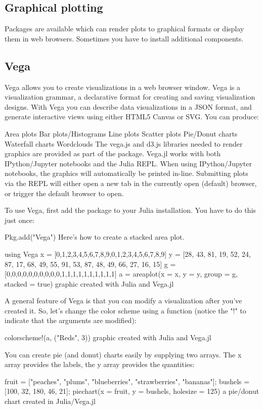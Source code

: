 \subsection*{Graphical plotting}
Packages are available which can render plots to graphical formats or display them in web browsers. Sometimes you have to install additional components.

\subsection*{Vega}
Vega allows you to create visualizations in a web browser window. Vega is a visualization grammar, a declarative format for creating and saving visualization designs. With Vega you can describe data visualizations in a JSON format, and generate interactive views using either HTML5 Canvas or SVG. You can produce:

Area plots
Bar plots/Histograms
Line plots
Scatter plots
Pie/Donut charts
Waterfall charts
Wordclouds
The vega.js and d3.js libraries needed to render graphics are provided as part of the package. Vega.jl works with both IPython/Jupyter notebooks and the Julia REPL. When using IPython/Jupyter notebooks, the graphics will automatically be printed in-line. Submitting plots via the REPL will either open a new tab in the currently open (default) browser, or trigger the default browser to open.

To use Vega, first add the package to your Julia installation. You have to do this just once:

Pkg.add("Vega")
Here's how to create a stacked area plot.

using Vega
x = [0,1,2,3,4,5,6,7,8,9,0,1,2,3,4,5,6,7,8,9]
y = [28, 43, 81, 19, 52, 24, 87, 17, 68, 49, 55, 91, 53, 87, 48, 49, 66, 27, 16, 15]
g = [0,0,0,0,0,0,0,0,0,0,1,1,1,1,1,1,1,1,1,1]
a = areaplot(x = x, y = y, group = g, stacked = true)
graphic created with Julia and Vega.jl

A general feature of Vega is that you can modify a visualization after you've created it. So, let's change the color scheme using a function (notice the "!" to indicate that the arguments are modified):

colorscheme!(a, ("Reds", 3))
graphic created with Julia and Vega.jl

You can create pie (and donut) charts easily by supplying two arrays. The x array provides the labels, the y array provides the quantities:

 fruit = ["peaches", "plums", "blueberries", "strawberries", "bananas"];
 bushels = [100, 32, 180, 46, 21];
 piechart(x = fruit, y = bushels, holesize = 125)
a pie/donut chart created in Julia/Vega.jl

